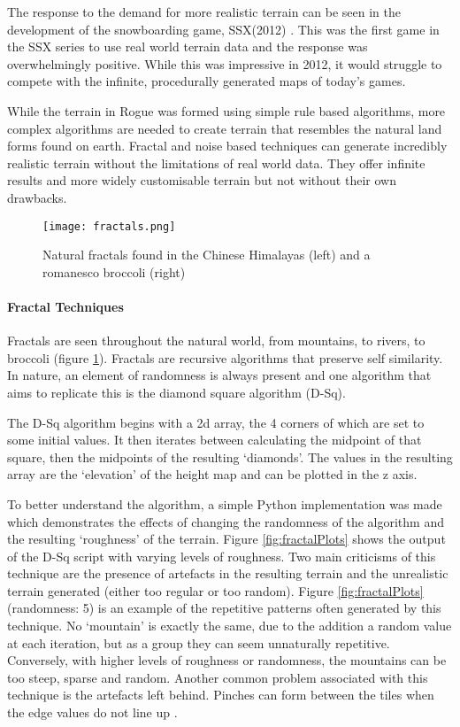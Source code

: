 \documentclass[a4paper]{report}
\begin{document}
The response to the demand for more realistic terrain can be seen in the development of the snowboarding game, SSX(2012) \cite{SSX}. This was the first game in the SSX series to use real world terrain data and the response was overwhelmingly positive. While this was impressive in 2012, it would struggle to compete with the infinite, procedurally generated maps of today's games.

While the terrain in Rogue was formed using simple rule based algorithms, more complex algorithms are needed to create terrain that resembles the natural land forms found on earth. Fractal and noise based techniques can generate incredibly realistic terrain without the limitations of real world data. They offer infinite results and more widely customisable terrain but not without their own drawbacks.

\begin{figure}[H]
    \centering
        \texttt{[image: fractals.png]}
        \caption{Natural fractals found in the Chinese Himalayas (left) and a romanesco broccoli (right)}
        \label{fig:fractals}
\end{figure}

\paragraph{Fractal Techniques}

Fractals are seen throughout the natural world, from mountains, to rivers, to broccoli (figure \ref{fig:fractals}). Fractals are recursive algorithms that preserve self similarity. In nature, an element of randomness is always present and one algorithm that aims to replicate this is the diamond square algorithm (D-Sq).

The D-Sq algorithm begins with a 2d array, the 4 corners of which are set to some initial values. It then iterates between calculating the midpoint of that square, then the midpoints of the resulting `diamonds'. The values in the resulting array are the `elevation' of the height map and can be plotted in the z axis.

To better understand the algorithm, a simple Python implementation was made which demonstrates the effects of changing the randomness of the algorithm and the resulting `roughness' of the terrain. Figure \ref{fig:fractalPlots} shows the output of the D-Sq script with varying levels of roughness. Two main criticisms of this technique are the presence of artefacts in the resulting terrain and the unrealistic terrain generated (either too regular or too random)\cite{Dsq}. Figure \ref{fig:fractalPlots}(randomness: 5) is an example of the repetitive patterns often generated by this technique. No `mountain' is exactly the same, due to the addition a random value at each iteration, but as a group they can seem unnaturally repetitive. Conversely, with higher levels of roughness or randomness, the mountains can be too steep, sparse and random. Another common problem associated with this technique is the artefacts left behind. Pinches can form between the tiles when the edge values do not line up \cite{proGen}.
\end{document}
